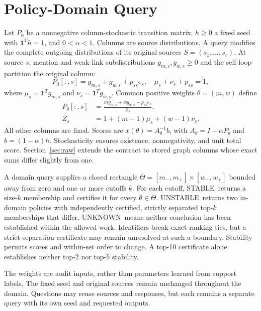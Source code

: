 \documentclass[conference]{IEEEtran}
\newcommand{\stable}{\textsf{STABLE}}
\newcommand{\unstable}{\textsf{UNSTABLE}}
\newcommand{\unknown}{\textsf{UNKNOWN}}
\newcommand{\one}{\boldsymbol{1}}
\begin{document}
\section{Policy-Domain Query}
\label{sec:problem}
Let $P_0$ be a nonnegative column-stochastic transition matrix, $h\geq0$ a fixed seed with $\one^Th=1$, and $0<\alpha<1$. Columns are source distributions. A query modifies the complete outgoing distributions of its original sources $S=(s_1,\ldots,s_r)$. At source $s$, mention and weak-link subdistributions $g_{m,s},g_{w,s}\geq0$ and the self-loop partition the original column:
\begin{equation}
 P_0[:,s]=g_{m,s}+g_{w,s}+p_{ss}e_s,\quad
 \mu_s+\nu_s+p_{ss}=1,
 \label{eq:partition}
\end{equation}
where $\mu_s=\one^Tg_{m,s}$ and $\nu_s=\one^Tg_{w,s}$. Common positive weights $\theta=(m,w)$ define
\begin{equation}
 \begin{aligned}
 P_\theta[:,s]&=\frac{m g_{m,s}+w g_{w,s}+p_{ss}e_s}{Z_s},\\
 Z_s&=1+(m-1)\mu_s+(w-1)\nu_s.
 \end{aligned}
 \label{eq:policy}
\end{equation}
All other columns are fixed. Scores are $x(\theta)=A_\theta^{-1}b$, with $A_\theta=I-\alpha P_\theta$ and $b=(1-\alpha)h$. Stochasticity ensures existence, nonnegativity, and unit total score. Section~\ref{sec:raw} extends the contract to stored graph columns whose exact sums differ slightly from one.

A domain query supplies a closed rectangle $\Theta=[m_-,m_+]\times[w_-,w_+]$ bounded away from zero and one or more cutoffs $k$. For each cutoff, \stable\ returns a size-$k$ membership and certifies it for every $\theta\in\Theta$. \unstable\ returns two in-domain policies with independently certified, strictly separated top-$k$ memberships that differ. \unknown\ means neither conclusion has been established within the allowed work. Identifiers break exact ranking ties, but a strict-separation certificate may remain unresolved at such a boundary. Stability permits scores and within-set order to change. A top-10 certificate alone establishes neither top-2 nor top-5 stability.

The weights are audit inputs, rather than parameters learned from support labels. The fixed seed and original sources remain unchanged throughout the domain. Questions may reuse sources and responses, but each remains a separate query with its own seed and requested outputs.
\end{document}
